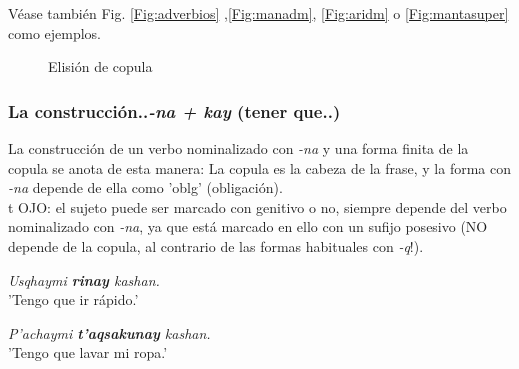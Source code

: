 \documentclass[a4paper,11pt,DIV12]{scrartcl}
\begin{document}
V\'ease tambi\'en Fig. \ref{Fig:adverbios} ,\ref{Fig:manadm}, \ref{Fig:aridm} o \ref{Fig:mantasuper} como ejemplos.

\begin{figure}
 \begin{center}
 \end{center}
\caption{Elisi\'on de copula}\label{Fig:KAN}
\end{figure}



\subsubsection{La construcci\'on..{\em -na + kay} (tener que..)}\label{Sec:nakay}

La construcci\'on de un verbo nominalizado con {\em -na} y una forma finita de la copula se anota de esta manera:
La copula es la cabeza de la frase, y la forma con {\em -na} depende de ella como 'oblg' (obligaci\'on).\\t
OJO: el sujeto puede ser marcado con genitivo o no, siempre depende del verbo nominalizado con {\em -na}, ya que est\'a marcado en ello con un sufijo posesivo (NO depende de la copula, al contrario de las formas habituales con {\em -q}!).

\begin{examples}
 \item {\em Usqhaymi \textbf{rinay} kashan.}\\
      'Tengo que ir r\'apido.'
 \item\label{Ex:nakay} {\em P'achaymi \textbf{t'aqsakunay} kashan.}\\
      'Tengo que lavar mi ropa.'\\
 	\hfill{\small \citep[210]{Cusi2}}
\end{examples}
\end{document}

